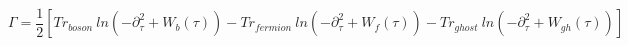 \begin{equation}
\Gamma=\frac{1}{2} [Tr _{boson}\ ln(-\partial_{\tau}^2+W_b(\tau)) - Tr 
_{fermion}\ ln(-\partial_{\tau}^2+W_f(\tau)) - Tr 
_{ghost}\ ln(-\partial_{\tau}^2+W_{gh}(\tau))]
\end{equation}

